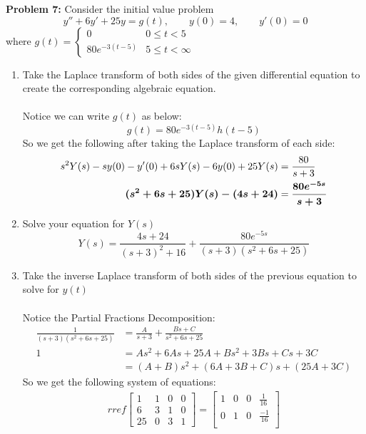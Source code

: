 \documentclass[12pt]{article}
\begin{document}
\newpage

\noindent \textbf{Problem 7: }Consider the initial value problem
	$$
	y''  + 6y' + 25y = g(t), \qquad y(0) = 4, \qquad y'(0) = 0
	$$
where 
	$
	g(t) = 
	\begin{cases}
		0 & 0 \leq t < 5 \\
		80e^{-3(t-5)} & 5 \leq t < \infty
	\end{cases}
	$
	\begin{enumerate}[label = (\alph*)]
		\item Take the Laplace transform of both sides of the given differential equation to create the corresponding algebraic equation.
		\\ \\
		Notice we can write $g(t)$ as below:
			$$
			g(t) = 80e^{-3(t-5)}h(t-5)
			$$
		So we get the following after taking the Laplace transform of each side:
			\begin{align*}
				s^2Y(s) - sy(0) - y'(0) + 6sY(s) - 6y(0) + 25Y(s) &= \frac{80}{s+3} \\
				\text{\boldmath $(s^2 + 6s + 25)Y(s) - (4s + 24)$} &= \text{\boldmath $\frac{80e^{-5s}}{s+3}$} 
			\end{align*}
		\item Solve your equation for $Y(s)$
			\boldmath
			$$
			Y(s) = \frac{4s + 24}{(s+3)^2 + 16} + \frac{80e^{-5s}}{(s+3)(s^2 + 6s + 25)}
			$$
			\unboldmath
		\item Take the inverse Laplace transform of both sides of the previous equation to solve for $y(t)$
		\\ \\
		Notice the Partial Fractions Decomposition:
		\begin{align*}
			\frac{1}{(s+3)(s^2 + 6s + 25)} &= \frac{A}{s+3} + \frac{Bs + C}{s^2 + 6s + 25} \\
			1 & = As^2 + 6As + 25A + Bs^2 + 3Bs + Cs + 3C \\
			&= (A+B)s^2 + (6A + 3B + C)s + (25A + 3C)
		\end{align*}
		So we get the following system of equations:
		\begin{align*}
		rref
		\begin{bmatrix}
		1 & 1 & 0 & 0 \\
		6 & 3 & 1 & 0 \\
		25 & 0 & 3 & 1
		\end{bmatrix}
		=
		\begin{bmatrix}
		1 & 0 & 0 & \frac{1}{16} \\
		0 & 1 & 0 & \frac{-1}{16} \\

\end{bmatrix}
\end{align*}
\end{enumerate}
\end{document}
